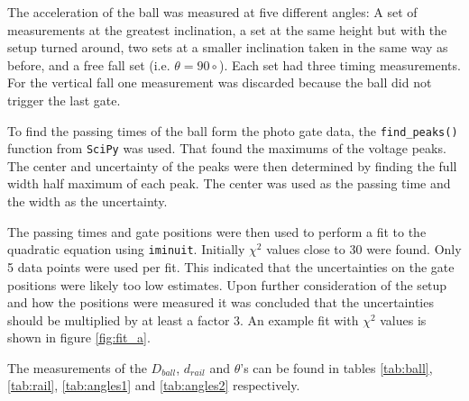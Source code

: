\documentclass[a4paper,%
               aps,%
               prl,%
               amsfonts,%
               amssymb,%
               amsmath,%
               nobibnotes,%
               twocolumn, %
               twoside,%
               balancelastpage,%
               eqsecnum] %
               {revtex4-1}
\begin{document}

The acceleration of the ball was measured at five different angles: A set of measurements at the greatest inclination, a set at the same height but with the setup turned around, two sets at a smaller inclination taken in the same way as before, and a free fall set (i.e. $\theta = 90 \circ$).
Each set had three timing measurements. For the vertical fall one measurement was discarded because the ball did not trigger the last gate.

To find the passing times of the ball form the photo gate data, the \texttt{find\_peaks()} function from \texttt{SciPy} was used. That found the maximums of the voltage peaks.
The center and uncertainty of the peaks were then determined by finding the full width half maximum of each peak. The center was used as the passing time and the width as the uncertainty.

The passing times and gate positions were then used to perform a fit to the quadratic equation using \texttt{iminuit}.
Initially $\chi ^2$ values close to 30 were found. Only 5 data points were used per fit.
This indicated that the uncertainties on the gate positions were likely too low estimates.
Upon further consideration of the setup and how the positions were measured it was concluded that the uncertainties should be multiplied by at least a factor 3.
An example fit with $\chi ^2$ values is shown in figure \ref{fig:fit_a}.

The measurements of the $D_{ball}$, $d_{rail}$ and $\theta$'s can be found in tables \ref{tab:ball}, \ref{tab:rail}, \ref{tab:angles1} and \ref{tab:angles2} respectively.
\end{document}

